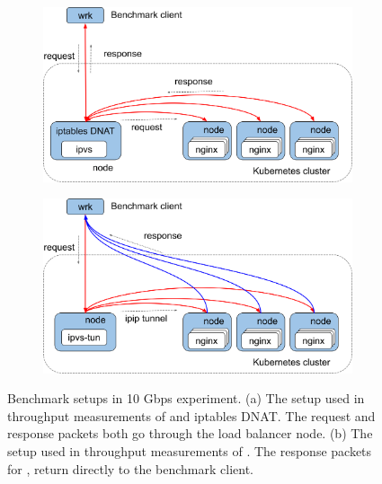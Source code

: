 \begin{figure}[h]
  \begin{subfigure}[t]{\columnwidth}
    \centering
    \includegraphics[width=0.8\columnwidth]{Figs/benchmark-schem-10g-nat}
    \par\bigskip
    \centering
    \begin{minipage}{0.9\columnwidth}
      \caption{}
      \label{fig:benchmark-schem-10g-nat}
    \end{minipage}
  \end{subfigure}

  \begin{subfigure}[t]{\columnwidth}
    \centering
    \includegraphics[width=0.8\columnwidth]{Figs/benchmark-schem-10g-dsr}
    \par\bigskip
    \centering
    \begin{minipage}{0.9\columnwidth}
      \caption{}
      \label{fig:benchmark-schem-10g-dsr}
    \end{minipage}
  \end{subfigure}

  \par\bigskip
  \centering
  \begin{minipage}{0.9\columnwidth}
    \caption[Benchmark setups in 10 Gbps experiment]{
      Benchmark setups in 10 Gbps experiment.
      (a) The setup used in throughput measurements of  and iptables DNAT.
      The request and response packets both go through the load balancer node.
      (b) The setup used in throughput measurements of .
      The response packets for , return directly to the benchmark client.
    }
    \label{fig:benchmark-schem-10g}
  \end{minipage}
\end{figure}

